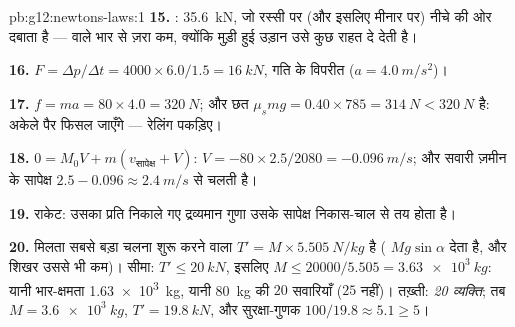 \begin{solution}{pb:g12:newtons-laws:1}
\textbf{15.} : \qty{35.6}{kN}, जो रस्सी पर (और इसलिए
मीनार पर) नीचे की ओर दबाता है ---  वाले भार से ज़रा कम, क्योंकि
मुड़ी हुई उड़ान उसे कुछ राहत दे देती है।

\textbf{16.} $F = \Delta p/\Delta t = 4000 \times 6.0/1.5 =
\qty{16}{kN}$, गति के विपरीत ($a = \qty{4.0}{m/s^2}$)।

\textbf{17.} $f = ma = 80 \times 4.0 = \qty{320}{N}$; और छत $\mu_s mg = 0.40 \times 785 = \qty{314}{N} < \qty{320}{N}$ है: अकेले पैर फिसल जाएँगे --- रेलिंग
पकड़िए।

\textbf{18.} $0 = M_0 V + m(v_{\text{सापेक्ष}} + V)$: $V = -80 \times 2.5/2080 = \qty{-0.096}{m/s}$; और सवारी ज़मीन के सापेक्ष $2.5 - 0.096 \approx \qty{2.4}{m/s}$ से चलती है।

\textbf{19.} राकेट: उसका  प्रति  निकाले गए द्रव्यमान गुणा
उसके सापेक्ष निकास-चाल से तय होता है।

\textbf{20.} मिलता सबसे बड़ा  चलना शुरू करने वाला $T' = M \times \qty{5.505}{N/kg}$ है
( $Mg\sin\alpha$ देता है, और शिखर उससे भी कम)। सीमा: $T' \leq \qty{20}{kN}$, इसलिए $M \leq 20000/5.505 = \qty{3.63e3}{kg}$:
यानी भार-क्षमता \qty{1.63e3}{kg}, यानी \qty{80}{kg} की $20$ सवारियाँ ($25$ नहीं)।
तख़्ती: \emph{20 व्यक्ति}; तब $M = \qty{3.6e3}{kg}$, $T' = \qty{19.8}{kN}$, और सुरक्षा-गुणक $100/19.8 \approx 5.1 \geq 5$।
\end{solution}

